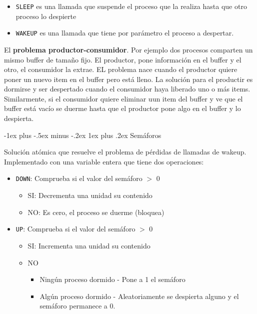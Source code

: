 \documentclass[10pt,portrait, twocolumn]{article}
\makeatletter
\renewcommand{\subsubsection}{\@startsection{subsubsection}{3}{0mm}%
                                {-1ex plus -.5ex minus -.2ex}%
                                {1ex plus .2ex}%
                                {\normalfont\small\bfseries}}
\makeatother
\begin{document}
	\begin{itemize}
	\item \texttt{SLEEP} es una llamada que suspende el proceso que la realiza hasta que otro proceso lo despierte
	\item \texttt{WAKEUP} es una llamada que tiene por parámetro el proceso a despertar.
	\end{itemize}
	
El \textbf{problema productor-consumidor}. Por ejemplo dos procesos comparten un mismo buffer de tamaño fijo. El productor, pone información en el buffer y el otro, el consumidor la extrae. EL problema nace cuando el productor quiere poner un nuevo item en el buffer pero está lleno. La solución para el productir es dormirse y ser despertado cuando el consumidor haya liberado uno o más items. Similarmente, si el consumidor quiere eliminar uun item del buffer y ve que el buffer está vacío se duerme hasta que el productor pone algo en el buffer y lo despierta.



\subsubsection{Semáforos}

Solución atómica que resuelve el problema de pérdidas de llamadas de wakeup. Implementado con una variable entera que tiene dos operaciones:

	\begin{itemize}
	\item \texttt{DOWN}: Comprueba si el valor del semáforo $>$ 0
		\begin{itemize}
		\item SI: Decrementa una unidad su contenido
		\item  NO: Es cero, el proceso se duerme (bloquea)
		\end{itemize}
	
	\item \texttt{UP}: Comprueba si el valor del semáforo $>$ 0
		\begin{itemize}
		\item SI: Incrementa una unidad su contenido 
		\item NO
			\begin{itemize}
			\item Ningún proceso dormido - Pone a 1 el semáforo
			\item Algún proceso dormido - Aleatoriamente se despierta alguno y el semáforo permanece a 0.
			\end{itemize}
		\end{itemize}
	\end{itemize}
\end{document}
